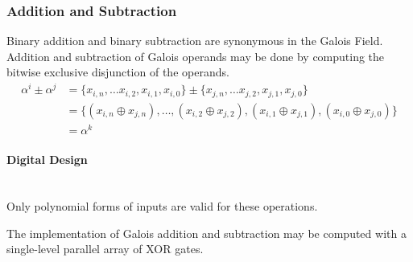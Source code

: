 \subsubsection{Addition and Subtraction} Binary addition and binary subtraction
are synonymous in the Galois Field. Addition and subtraction of Galois operands
may be done by computing the bitwise exclusive disjunction of the operands.
    \begin{equation*}
        \begin{split}
            \alpha^{i} \pm \alpha^{j} & = \{ x_{i, n}, \ldots x_{i, 2},
            x_{i, 1}, x_{i, 0} \} \pm \{ x_{j, n}, \ldots x_{j, 2}, x_{j, 1},
            x_{j, 0} \} \\
            & = \{(x_{i, n} \oplus x_{j,n}), \ldots, (x_{i, 2} \oplus x_{j,
            2}), (x_{i, 1}\oplus x_{j, 1}), (x_{i, 0}\oplus x_{j, 0})\} \\
            & = \alpha^{k}
        \end{split}
    \end{equation*}

    \paragraph{{\small Digital Design}} \leavevmode \\ Only polynomial forms of
    inputs are valid for these operations.

    The implementation of Galois addition and subtraction may be computed with
    a single-level parallel array of XOR gates.
